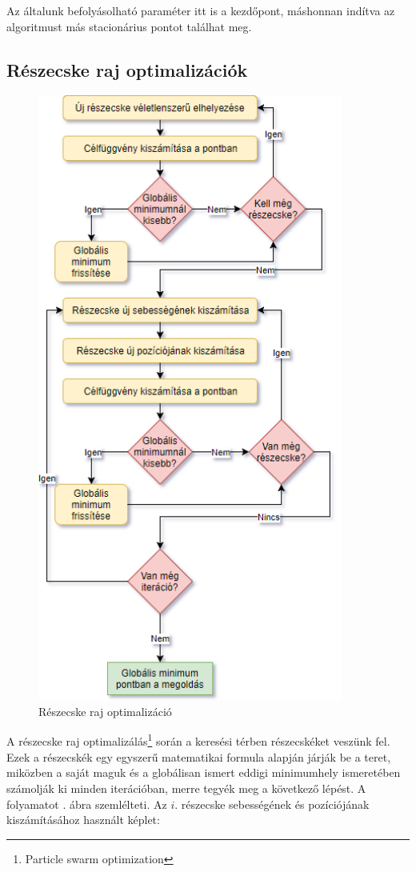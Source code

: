Az általunk befolyásolható paraméter itt is a kezdőpont, máshonnan indítva az algoritmust más stacionárius pontot találhat meg.

\subsection{Részecske raj optimalizációk}

\begin{figure}
	\centering
	\includegraphics[height=200mm, keepaspectratio]{figures/pso.png}
	\caption{Részecske raj optimalizáció}
	\label{fig:pso}
\end{figure}
A részecske raj optimalizálás\footnote{Particle swarm optimization} során a keresési térben részecskéket veszünk fel. Ezek a részecskék egy egyszerű matematikai formula alapján járják be a teret, miközben a saját maguk és a globálisan ismert eddigi minimumhely ismeretében számolják ki minden iterációban, merre tegyék meg a következő lépést. A folyamatot . ábra szemlélteti. Az $i.$ részecske sebességének és pozíciójának kiszámításához használt képlet:
